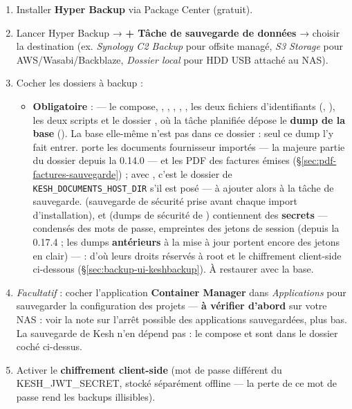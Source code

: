 \documentclass[a4paper,11pt,oneside]{article}
\begin{document}
\begin{enumerate}
    \item Installer \textbf{Hyper Backup} via Package Center (gratuit).
    \item Lancer Hyper Backup → \textbf{+ Tâche de sauvegarde de données} → choisir la destination (ex. \emph{Synology C2 Backup} pour offsite managé, \emph{S3 Storage} pour AWS/Wasabi/Backblaze, \emph{Dossier local} pour HDD USB attaché au NAS).
    \item Cocher les dossiers à backup :
        \begin{itemize}
            \item \textbf{Obligatoire} :  --- le compose, , , , , , les deux fichiers d'identifiants (, ), les deux scripts et le dossier , où la tâche planifiée dépose le \textbf{dump de la base} (). La base elle-même n'est pas dans ce dossier : seul ce dump l'y fait entrer.  porte les documents fournisseur importés --- la majeure partie du dossier depuis la 0.14.0 --- et les PDF des factures émises (\S\ref{sec:pdf-factures-sauvegarde}) ; avec , c'est le dossier de \texttt{KESH\_DOCUMENTS\_HOST\_DIR} s'il est posé --- à ajouter alors à la tâche de sauvegarde.  (sauvegarde de sécurité prise avant chaque import d'installation),  et  (dumps de sécurité de ) contiennent des \textbf{secrets} --- condensés des mots de passe, empreintes des jetons de session (depuis la 0.17.4 ; les dumps \textbf{antérieurs} à la mise à jour portent encore des jetons en clair) --- : d'où leurs droits réservés à root et le chiffrement client-side ci-dessous (\S\ref{sec:backup-ui-keshbackup}). À restaurer avec la base.
        \end{itemize}
    \item \emph{Facultatif} : cocher l'application \textbf{Container Manager} dans \emph{Applications} pour sauvegarder la configuration des projets --- \textbf{à vérifier d'abord} sur votre NAS : voir la note sur l'arrêt possible des applications sauvegardées, plus bas. La sauvegarde de Kesh n'en dépend pas : le compose et  sont dans le dossier coché ci-dessus.
    \item Activer le \textbf{chiffrement client-side} (mot de passe différent du KESH\_JWT\_SECRET, stocké séparément offline — la perte de ce mot de passe rend les backups illisibles).

\end{enumerate}
\end{document}
